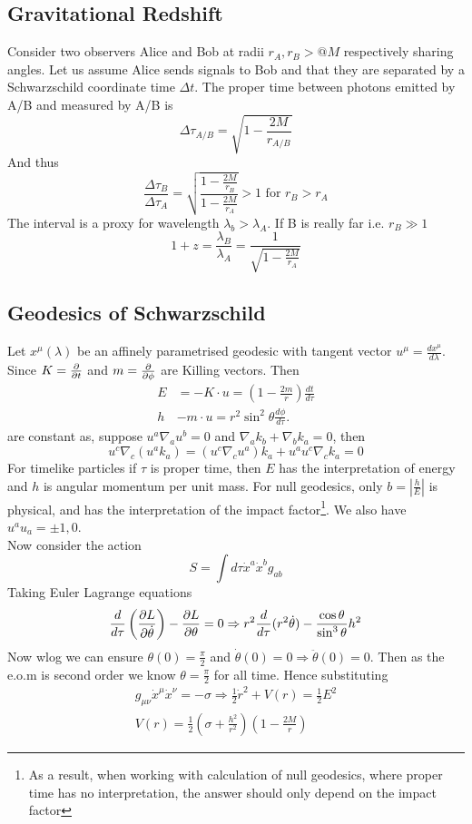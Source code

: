 \documentclass{article}
\begin{document}
\subsection{Gravitational Redshift}
Consider two observers Alice and Bob at radii $r_A,r_B>@M$ respectively sharing angles. Let us assume Alice sends signals to Bob and that they are separated by a Schwarzschild coordinate time $\Delta t$. The proper time between photons emitted by A/B and measured by A/B is 
\[
\Delta\tau_{A/B} = \sqrt{1-\frac{2M}{r_{A/B}}}
\]
And thus 
\[
\frac{\Delta \tau_B}{\Delta\tau_A}=\sqrt{\frac{1-\frac{2M}{r_B}}{1-\frac{2M}{r_A}}}>1 \text{ for } r_B > r_A
\]
The interval is a proxy for wavelength $\lambda_b > \lambda_A$. If B is really far i.e. $r_B \gg 1$
\[
1+z = \frac{\lambda_B}{\lambda_A} = \frac{1}{\sqrt{1-\frac{2M}{r_A}}}
\]

\subsection{Geodesics of Schwarzschild}
Let $x^\mu(\lambda)$ be an affinely parametrised geodesic with tangent vector $u^\mu = \frac{dx^\mu}{d\lambda}$. Since $K=\pd{t}$ and $m=\pd{\phi}$ are Killing vectors. Then
\begin{align*}
    E &= -K\cdot u = (1-\frac{2m}{r}) \frac{dt}{d\tau} \\
    h &- m\cdot u = r^2 \sin^2\theta \frac{d\phi}{d\tau}. 
\end{align*}
are constant as, suppose $u^a \nabla_a u^b=0$ and $\nabla_a k_b + \nabla_b k_a = 0$, then 
\[
u^c \nabla_c (u^a k_a) = (u^c \nabla_c u^a)k_a + u^a u^c \nabla_c k_a = 0 
\]
For timelike particles if $\tau$ is proper time, then $E$ has the interpretation of energy and $h$ is angular momentum per unit mass. For null geodesics, only $b = \left\lvert \frac{h}{E} \right\rvert$ is physical, and has the interpretation of the impact factor\footnote{As a result, when working with calculation of null geodesics, where proper time has no interpretation, the answer should only depend on the impact factor}.
We also have $u^a u_a = \pm1,0$. \\
Now consider the action 
\[
S = \int d\tau \dot{x}^a \dot{x}^b g_{ab}
\]
Taking Euler Lagrange equations 
\[
\frac{d}{d\tau} \left( \pd[L]{\dot{\theta}} \right) - \pd[L]{\theta} = 0 \Rightarrow r^2 \frac{d}{d\tau}(r^2 \dot{\theta}) - \frac{\cos\theta}{\sin^3\theta} h^2
\] 
Now wlog we can ensure $\theta(0)=\frac{\pi}{2}$ and $\dot{\theta}(0)=0 \Rightarrow \ddot{\theta}(0)=0$. Then as the e.o.m is second order we know $\theta=\frac{\pi}{2}$ for all time. 
Hence substituting
\begin{align*}
g_{\mu\nu}\dot{x}^\mu \dot{x}^\nu = -\sigma \Rightarrow \frac{1}{2}\dot{r}^2 + V(r) = \frac{1}{2}E^2 \\
V(r) = \frac{1}{2} \left( \sigma +\frac{h^2}{r^2} \right) \left( 1-\frac{2M}{r} \right)
\end{align*}
\end{document}
